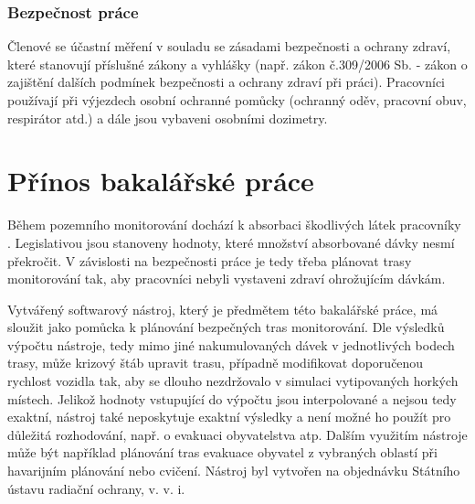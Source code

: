 \subsubsection{Bezpečnost práce}

Členové  se účastní měření v souladu se zásadami bezpečnosti a ochrany zdraví, které stanovují příslušné zákony a vyhlášky (např. zákon č.309/2006 Sb. - zákon o zajištění dalších podmínek bezpečnosti a ochrany zdraví při práci). Pracovníci používají při výjezdech osobní ochranné pomůcky (ochranný oděv, pracovní obuv, respirátor atd.) a dále jsou vybaveni osobními dozimetry. 

\section{Přínos bakalářské práce}
Během pozemního monitorování dochází k absorbaci škodlivých látek pracovníky . Legislativou jsou stanoveny hodnoty, které množství absorbované dávky nesmí překročit. V závislosti na bezpečnosti práce je tedy třeba plánovat trasy monitorování tak, aby pracovníci  nebyli vystaveni zdraví ohrožujícím dávkám. 

Vytvářený softwarový nástroj, který je předmětem této bakalářské práce, má sloužit jako pomůcka k plánování bezpečných tras monitorování. Dle výsledků výpočtu nástroje, tedy mimo jiné nakumulovaných dávek v jednotlivých bodech trasy, může krizový štáb upravit trasu, případně modifikovat doporučenou rychlost vozidla tak, aby se dlouho nezdržovalo v simulaci vytipovaných horkých místech. Jelikož hodnoty vstupující do výpočtu jsou interpolované a nejsou tedy exaktní, nástroj také neposkytuje exaktní výsledky a není možné ho použít pro důležitá rozhodování, např. o evakuaci obyvatelstva atp. Dalším využitím nástroje může být například plánování tras evakuace obyvatel z vybraných oblastí při havarijním plánování nebo cvičení. Nástroj byl vytvořen na objednávku Státního ústavu radiační ochrany, v. v. i.
